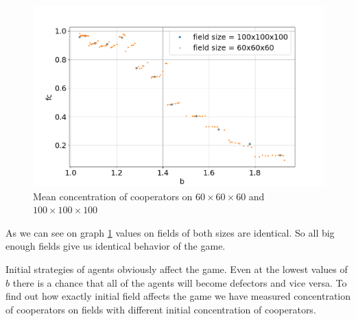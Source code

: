 \documentclass[a4paper,12pt]{article}
\begin{document}
\begin{figure}[h]
	\centering
	
	\includegraphics[width = \textwidth]{Fc_60_and_100.png}
	\caption{Mean concentration of cooperators on $60\times60\times60$ and $100\times100\times100$	}
	\label{fig:Fc100}

\end{figure}

As we can see on graph \ref{fig:Fc100} values on fields of both sizes are identical. So all big enough fields give us identical behavior of the game.

Initial strategies of agents obviously affect the game. Even at the lowest values of $b$ there is a chance that all of the agents will become defectors and vice versa. To find out how exactly initial field affects the game we have measured concentration of cooperators on fields with different initial concentration of cooperators.
\end{document}
